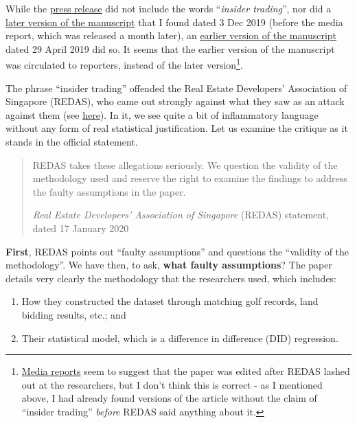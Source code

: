 \documentclass[
  openany]{book}
\providecommand{\tightlist}{%
  \setlength{\itemsep}{0pt}\setlength{\parskip}{0pt}}
\begin{document}
While the \href{https://bschool.nus.edu.sg/media/press-release-details/636/}{press release} did not include the words ``\emph{insider trading}'', nor did a \href{https://www.arx.cfa/-/media/regional/arx/post-pdf/2019/12/24/afbc-2019-golfing-for-information.ashx}{later version of the manuscript} that I found dated 3 Dec 2019 (before the media report, which was released a month later), an \href{https://editorialexpress.com/cgi-bin/conference/download.cgi?db_name=AFAPS2020\&paper_id=234}{earlier version of the manuscript} dated 29 April 2019 did so. It seems that the earlier version of the manuscript was circulated to reporters, instead of the later version\footnote{\href{https://www.todayonline.com/singapore/nus-researchers-drop-claim-insider-trading-among-real-estate-executives-golf-course}{Media reports} seem to suggest that the paper was edited after REDAS lashed out at the researchers, but I don't think this is correct - as I mentioned above, I had already found versions of the article without the claim of ``insider trading'' \emph{before} REDAS said anything about it.}.

The phrase ``insider trading'' offended the Real Estate Developers' Association of Singapore (REDAS), who came out strongly against what they saw as an attack against them (see \href{https://www.redas.com/assets/files/press\%20release/2019/REDAS_Response_NUS_Study_on_Link.pdf}{here}). In it, we see quite a bit of inflammatory language without any form of real statistical justification. Let us examine the critique as it stands in the official statement.

\begin{quote}
REDAS takes these allegations seriously. We question the validity of the methodology used and reserve the right to examine the findings to address the faulty assumptions in the paper.

\emph{Real Estate Developers' Association of Singapore} (REDAS) statement, dated 17 January 2020
\end{quote}

\textbf{First}, REDAS points out ``faulty assumptions'' and questions the ``validity of the methodology''. We have then, to ask, \textbf{what faulty assumptions}? The paper details very clearly the methodology that the researchers used, which includes:

\begin{enumerate}
\def\labelenumi{\arabic{enumi}.}
\tightlist
\item
  How they constructed the dataset through matching golf records, land bidding results, etc.; and
\item
  Their statistical model, which is a difference in difference (DID) regression.
\end{enumerate}
\end{document}

